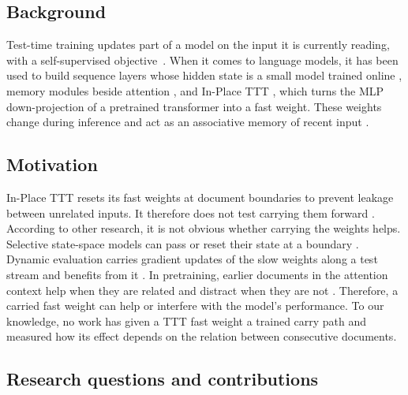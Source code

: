 \documentclass[10pt]{article} %
\begin{document}
\subsection{Background}

Test-time training updates part of a model on the input it is currently reading, with a self-supervised objective~\citep{sun2020ttt}. When it comes to language models, it has been used to build sequence layers whose hidden state is a small model trained online \citep{sun2025learning}, memory modules beside attention \citep{behrouz2025titans}, and In-Place TTT \citep{feng2026inplace}, which turns the MLP down-projection of a pretrained transformer into a fast weight. These weights change during inference and act as an associative memory of recent input \citep{hinton1987using,schmidhuber1992learning,ba2016using,schlag2021linear}.

\subsection{Motivation}

In-Place TTT resets its fast weights at document boundaries to prevent leakage between unrelated inputs. It therefore does not test carrying them forward \citep{feng2026inplace}. According to other research, it is not obvious whether carrying the weights helps. Selective state-space models can pass or reset their state at a boundary \citep{gu2024mamba}. Dynamic evaluation carries gradient updates of the slow weights along a test stream and benefits from it \citep{krause2018dynamic}. In pretraining, earlier documents in the attention context help when they are related and distract when they are not \citep{zhao2024analysing}. Therefore, a carried fast weight can help or interfere with the model's performance. To our knowledge, no work has given a TTT fast weight a trained carry path and measured how its effect depends on the relation between consecutive documents.

\subsection{Research questions and contributions}
\end{document}
